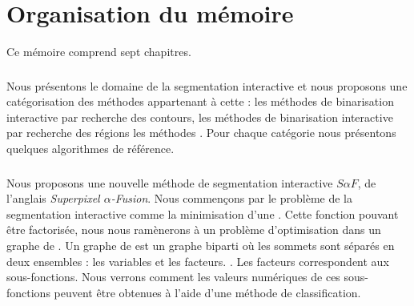 \section{Organisation du mémoire}

Ce mémoire comprend sept chapitres.

\subsubsection*{} 

\subsubsection*{} 
Nous présentons le domaine de la segmentation interactive et nous proposons une catégorisation des méthodes appartenant à cette  : les méthodes de binarisation interactive par recherche des contours, les méthodes de binarisation interactive par recherche des régions  les méthodes . Pour chaque catégorie\modif{,} nous présentons quelques algorithmes de référence. 

\subsubsection*{}
Nous proposons une nouvelle méthode de segmentation interactive  $S \alpha F$, de l'anglais \og \emph{Superpixel $\alpha$-Fusion}\fg. Nous commençons par  le problème de la segmentation interactive comme la minimisation d'une . Cette fonction pouvant être factorisée, nous nous ramènerons à un problème d'optimisation dans un graphe de . Un graphe de  est un graphe biparti où les sommets sont séparés en deux ensembles : les variables et les facteurs. . Les facteurs correspondent aux sous-fonctions. Nous verrons comment les valeurs numériques de ces sous-fonctions peuvent être obtenues à l'aide d'une méthode de classification. 

